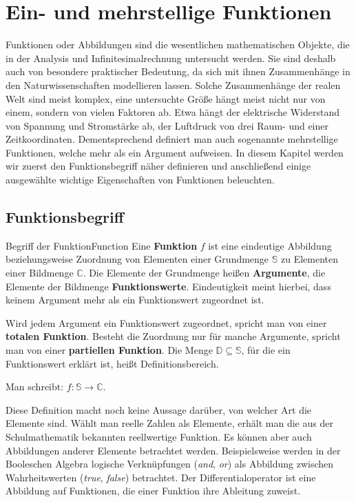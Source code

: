 \chapter{Ein- und mehrstellige Funktionen}

Funktionen oder Abbildungen sind die wesentlichen mathematischen Objekte, die in der Analysis und Infinitesimalrechnung untersucht werden. Sie sind deshalb auch von besondere praktischer Bedeutung, da sich mit ihnen Zusammenhänge in den Naturwissenschaften modellieren lassen. Solche Zusammenhänge der realen Welt sind meist komplex, eine untersuchte Größe hängt meist nicht nur von einem, sondern von vielen Faktoren ab. Etwa hängt der elektrische Widerstand von Spannung und Stromstärke ab, der Luftdruck von drei Raum- und einer Zeitkoordinaten. Dementsprechend definiert man auch sogenannte mehrstellige Funktionen, welche mehr als ein Argument aufweisen. In diesem Kapitel werden wir zuerst den Funktionsbegriff näher definieren und anschließend einige ausgewählte wichtige Eigenschaften von Funktionen beleuchten.

\section{Funktionsbegriff}

\begin{definition}{Begriff der Funktion}{Function}
    Eine \textbf{Funktion} $f$ ist eine eindeutige Abbildung beziehungsweise Zuordnung von Elementen einer Grundmenge $\mathbb{S}$ zu Elementen einer Bildmenge $\mathbb{C}$. Die Elemente der Grundmenge heißen \textbf{Argumente}, die Elemente der Bildmenge \textbf{Funktionswerte}. Eindeutigkeit meint hierbei, dass keinem Argument mehr als ein Funktionswert zugeordnet ist.

    Wird jedem Argument ein Funktionswert zugeordnet, spricht man von einer \textbf{totalen Funktion}. Besteht die Zuordnung nur für manche Argumente, spricht man von einer \textbf{partiellen Funktion}. Die Menge $\mathbb{D} \subseteq \mathbb{S}$, für die ein Funktionswert erklärt ist, heißt Definitionsbereich.

    Man schreibt: $f: \mathbb{S} \to \mathbb{C}$.
\end{definition}

Diese Definition macht noch keine Aussage darüber, von welcher Art die Elemente sind. Wählt man reelle Zahlen als Elemente, erhält man die aus der Schulmathematik bekannten reellwertige Funktion. Es können aber auch Abbildungen anderer Elemente betrachtet werden. Beispielsweise werden in der Booleschen Algebra logische Verknüpfungen (\emph{and}, \emph{or}) als Abbildung zwischen Wahrheitswerten (\emph{true}, \emph{false}) betrachtet. Der Differentialoperator ist eine Abbildung auf Funktionen, die einer Funktion ihre Ableitung zuweist.

